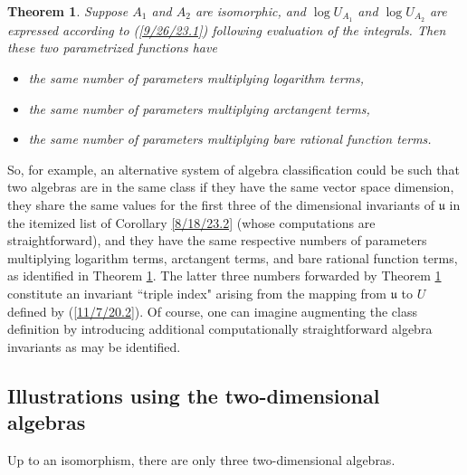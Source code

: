 \documentclass{amsart}
\numberwithin{equation}{section}
\newtheorem{theorem}{Theorem}
\theoremstyle{definition}
\numberwithin{theorem}{section}
\begin{document}
\enlargethispage{1cm}
\begin{theorem} \label{6/6/23.3} Suppose $A_1$ and $A_2$ are isomorphic, and $\log U_{A_1}$ and $\log U_{A_2}$ are expressed according to (\ref{9/26/23.1}) following evaluation of the integrals.  Then these two parametrized functions have
\begin{itemize} \item  the same number of parameters multiplying logarithm terms,  \item  the same number of parameters multiplying arctangent terms, 
 \item   the same number of parameters multiplying bare rational function terms. \end{itemize}
\end{theorem}


So, for example, an alternative system of algebra classification  could be such that two algebras are in the same class if they have the same vector space dimension, they share the same values for the first three of the dimensional invariants of $\mathfrak{u}$ in the itemized list of Corollary \ref{8/18/23.2} (whose computations are straightforward), and they have the same respective numbers of parameters multiplying logarithm terms, arctangent terms, and bare rational function terms, as identified in Theorem \ref{6/6/23.3}.   The latter three numbers forwarded by Theorem \ref{6/6/23.3} constitute an invariant ``triple index" arising from the mapping from $\mathfrak{u}$ to $ U$ defined by (\ref{11/7/20.2}).  
Of course, one can imagine augmenting the class definition by introducing additional computationally straightforward algebra invariants as may be identified.  

\subsection{Illustrations using the two-dimensional algebras}
Up to an isomorphism, there are only three two-dimensional algebras.
\end{document}
